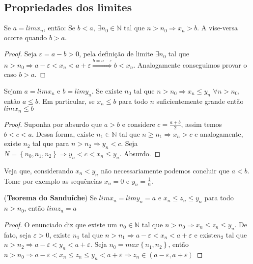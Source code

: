 \subsection{Propriedades dos limites}
 
\begin{theorem}
Se $a=limx_{n}$, então: Se $b<a$, $\exists n_{0} \in \mathbb{N}$ tal que $n>n_{0} \Rightarrow x_{n}>b$. A vise-versa ocorre quando $b>a$.
\end{theorem}
\begin{proof}
Seja $\varepsilon=a-b>0$, pela definição de limite $\exists n_{0}$ tal que $n>n_{0} \Rightarrow a-\varepsilon<x_{n}<a+\varepsilon \overset{b=a-\varepsilon }{\Rightarrow } b<x_{n}$. Analogamente conseguimos provar o caso $b>a$.
\end{proof}

\begin{corol}
Sejam $a=limx_{n}$ e $b=limy_{n}$. Se existe $n_{0}$ tal que $n>n_{0} \Rightarrow x_{n}\leq y_{n}$ $\forall n>n_{0}$, então $a\leq b$. Em particular, se $x_{n}\leq b$ para todo $n$ suficientemente grande então $lim x_{n} \leq b$
\end{corol}

\begin{proof}
Suponha por absurdo que $a>b$ e considere $c=\frac{a+b}{2}$, assim temos $b<c<a$. Dessa forma, existe $n_{1} \in \mathbb{N}$ tal que $n \geq n_{1} \Rightarrow x_{n}>c$ e analogamente, existe $n_{2}$ tal que para $n>n_{2} \Rightarrow y_{n} < c$. Seja $N=\left \{ n_{0},n_{1},n_{2} \right \} \Rightarrow y_{n}<c<x_{n}\leq y_{n}$. Absurdo.
\end{proof}
Veja que, considerando $x_{n} < y_{n}$ não necessariamente podemos concluir que $a<b$. Tome por exemplo as sequências $x_{n}=0$ e $y_{n}=\frac{1}{n}$.

\begin{theorem}(\textbf{Teorema do Sanduíche})
Se $limx_{n}=limy_{n}=a$ e $x_{n} \leq z_{n} \leq y_{n}$ para todo $n>n_{0}$, então $limz_{n}=a$
\end{theorem}

\begin{proof}
O enunciado diz que existe um $n_{0} \in \mathbb{N}$ tal que $n>n_{0} \Rightarrow x_{n} \leq z_{n} \leq y_{n}$. De fato, seja $\varepsilon>0$, existe $n_{1}$ tal que $n>n_{1} \Rightarrow a-\varepsilon<x_{n}<a+\varepsilon$ e existe$n_{2}$ tal que $n>n_{2} \Rightarrow a-\varepsilon < y_{n} < a+\varepsilon$. Seja $n_{0}=max\left \{ n_{1},n_{2} \right \}$, então $n>n_{0} \Rightarrow a-\varepsilon<x_{n}\leq z_{n}\leq y_{n}<a+\varepsilon \Rightarrow z_{n} \in (a-\varepsilon,a+\varepsilon)$
\end{proof}

